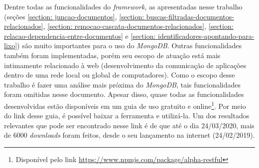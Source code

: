 
Dentre todas as funcionalidades do \textit{framework}, as apresentadas nesse trabalho (seções \ref{section: juncao-documentos}, \ref{section: buscas-filtradas-documentos-relacionados}, \ref{section: remocao-cascata-documentos-relacionados}, \ref{section: relacao-dependencia-entre-documentos} e \ref{section: identificadores-apontando-para-lixo}) são muito importantes para o uso do \textit{MongoDB}. Outras funcionalidades também foram implementadas, porém seu escopo de atuação está mais intimamente relacionado à web (desenvolvimento da comunicação de aplicações dentro de uma rede local ou global de computadores). Como o escopo desse trabalho é fazer uma análise mais próxima do \textit{MongoDB}, tais funcionalidades foram omitidas nesse documento. Apesar disso, quase todas as funcionalidades desenvolvidas estão disponíveis em um guia de uso gratuito e online\footnote{Disponível pelo link \url{https://www.npmjs.com/package/alpha-restful}}. Por meio do link desse guia, é possível baixar a ferramenta e utilizá-la. Um dos resultados relevantes que pode ser encontrado nesse link é de que até o dia 24/03/2020, mais de 6000 \textit{downloads} foram feitos, desde o seu lançamento na internet (24/02/2019).